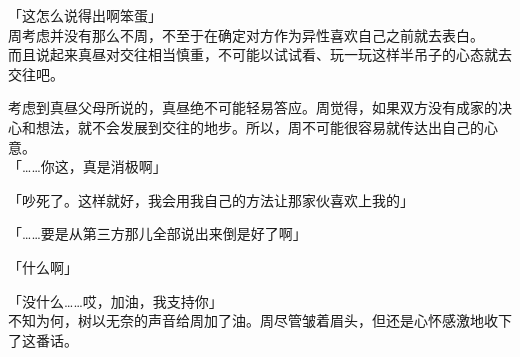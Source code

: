 「这怎么说得出啊笨蛋」\\

周考虑并没有那么不周，不至于在确定对方作为异性喜欢自己之前就去表白。\\

而且说起来真昼对交往相当慎重，不可能以试试看、玩一玩这样半吊子的心态就去交往吧。

考虑到真昼父母所说的，真昼绝不可能轻易答应。周觉得，如果双方没有成家的决心和想法，就不会发展到交往的地步。所以，周不可能很容易就传达出自己的心意。\\

「……你这，真是消极啊」

「吵死了。这样就好，我会用我自己的方法让那家伙喜欢上我的」

「……要是从第三方那儿全部说出来倒是好了啊」

「什么啊」

「没什么……哎，加油，我支持你」\\

不知为何，树以无奈的声音给周加了油。周尽管皱着眉头，但还是心怀感激地收下了这番话。

